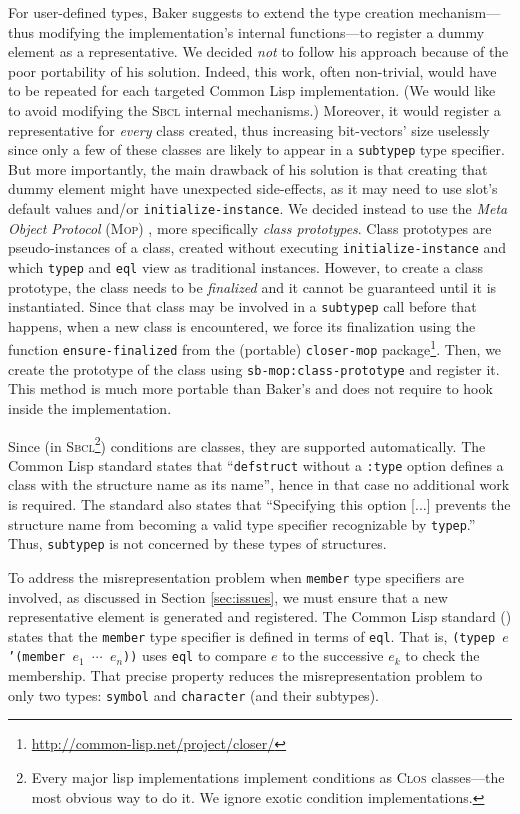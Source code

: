 \documentclass[format=sigconf]{acmart}
\newcommand\code[2][\small]{\sloppy\texttt{#1#2}}
\theoremstyle{definition}
\newcommand\sbcl{\textsc{Sbcl}}
\begin{document}
For user-defined types, Baker suggests to extend the type creation
mechanism---thus modifying the implementation's internal functions---to
register a dummy element as a representative. We decided \emph{not} to follow
his approach because of the poor portability of his solution. Indeed, this
work, often non-trivial, would have to be repeated for each targeted Common Lisp
implementation. (We would like to avoid modifying the \sbcl{} internal
mechanisms.)
Moreover, it would register a representative for \emph{every}
class created, thus increasing bit-vectors' size uselessly since only a few of
these classes are likely to appear in a \code{subtypep} type specifier.
But more importantly, the main drawback of his solution is that creating that
dummy element might have unexpected side-effects, as it may need to use slot's
default values and/or \code{initialize-instance}.
We decided instead to use the \emph{Meta Object Protocol} (\textsc{Mop})
\cite{bib:kiczales.91.book}, more specifically \emph{class prototypes}. Class
prototypes are pseudo-instances of a class, created without executing
\code{initialize-instance} and which \code{typep} and \code{eql} view as
traditional instances. However, to create a class prototype, the class needs to
be \emph{finalized} and it cannot be guaranteed until it is instantiated.
Since that class may be involved in a \code{subtypep} call before that happens,
when a new class is encountered, we force its finalization using the function
\code{ensure-finalized} from the (portable) \code{closer-mop} package\footnote{
  \url{http://common-lisp.net/project/closer/}
}.
Then, we create the prototype of the class using \code{sb-mop:class-prototype}
and register it. This method is much more portable than Baker's and does not
require to hook inside the implementation.

Since (in \sbcl\footnote{Every major lisp implementations implement conditions
  as \textsc{Clos} classes---the most obvious way to do it. We ignore exotic
  condition implementations.}) conditions are classes, they are supported
automatically.
The Common Lisp standard \cite{bib:ansi.94.cl} states that ``\code{defstruct}
without a \code{:type} option defines a class with the structure name as its
name'', hence in that case no additional work is required. The standard also
states that ``Specifying this option [...] prevents the structure name from
becoming a valid type specifier recognizable by \code{typep}.'' Thus,
\code{subtypep} is not concerned by these types of structures.

To address the misrepresentation problem when \code{member} type specifiers are
involved, as discussed in Section \ref{sec:issues}, we must ensure that a new
representative element is generated and registered. The Common Lisp
standard (\cite{bib:ansi.94.cl}) states that the \code{member} type specifier is
defined in terms of \code{eql}. That is, \code{(typep $e$ '(member $e_1$
  $\cdots$ $e_n$))} uses \code{eql} to compare $e$ to the successive $e_k$ to
check the membership. That precise property reduces the misrepresentation
problem to only two types: \code{symbol} and \code{character} (and their
subtypes).
\end{document}
